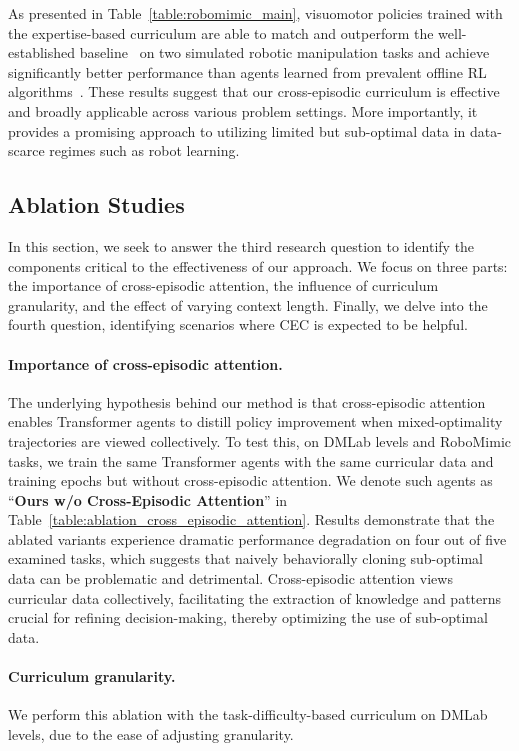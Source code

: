 \documentclass{article}
\newcommand{\para}[1]{\paragraph{#1}\looseness=-1}
\begin{document}
As presented in Table~\ref{table:robomimic_main}, visuomotor policies trained with the expertise-based curriculum are able to match and outperform the well-established baseline~\citep{mandlekar2021matters} on two simulated robotic manipulation tasks and achieve significantly better performance than agents learned from prevalent offline RL algorithms~\citep{fujimoto2018offpolicy,kumar2020conservative}.
These results suggest that our cross-episodic curriculum is effective and broadly applicable across various problem settings.
More importantly, it provides a promising approach to utilizing limited but sub-optimal data in data-scarce regimes such as robot learning.
\vspace{-0.5em}
\subsection{Ablation Studies}
In this section, we seek to answer the third research question to identify the components critical to the effectiveness of our approach.
We focus on three parts: the importance of cross-episodic attention, the influence of curriculum granularity, and the effect of varying context length.
Finally, we delve into the fourth question, identifying scenarios where CEC is expected to be helpful.


\vspace{-0.5em}
\para{Importance of cross-episodic attention.}
The underlying hypothesis behind our method is that cross-episodic attention enables Transformer agents to distill policy improvement when mixed-optimality trajectories are viewed collectively.
To test this, on DMLab levels and RoboMimic tasks, we train the same Transformer agents with the same curricular data and training epochs but without cross-episodic attention.
We denote such agents as ``\textbf{Ours w/o Cross-Episodic Attention}'' in Table~\ref{table:ablation_cross_episodic_attention}.
Results demonstrate that the ablated variants experience dramatic performance degradation on four out of five examined tasks, which suggests that naively behaviorally cloning sub-optimal data can be problematic and detrimental.
Cross-episodic attention views curricular data collectively, facilitating the extraction of knowledge and patterns crucial for refining decision-making, thereby optimizing the use of sub-optimal data.
\vspace{-0.5em}
\para{Curriculum granularity.} We perform this ablation with the task-difficulty-based curriculum on DMLab levels, due to the ease of adjusting granularity.
\end{document}
